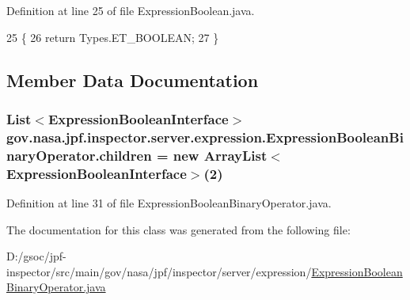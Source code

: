 Definition at line 25 of file Expression\+Boolean.\+java.


\begin{DoxyCode}
25                           \{
26     \textcolor{keywordflow}{return} Types.ET\_BOOLEAN;
27   \}
\end{DoxyCode}


\subsection{Member Data Documentation}
\subsubsection[{\texorpdfstring{children}{children}}]{\setlength{\rightskip}{0pt plus 5cm}List$<${\bf Expression\+Boolean\+Interface}$>$ gov.\+nasa.\+jpf.\+inspector.\+server.\+expression.\+Expression\+Boolean\+Binary\+Operator.\+children = new Array\+List$<${\bf Expression\+Boolean\+Interface}$>$(2)\hspace{0.3cm}{\ttfamily [protected]}}\hypertarget{classgov_1_1nasa_1_1jpf_1_1inspector_1_1server_1_1expression_1_1_expression_boolean_binary_operator_aa51f2a94e4b46898cc588a25f3957f6f}{}\label{classgov_1_1nasa_1_1jpf_1_1inspector_1_1server_1_1expression_1_1_expression_boolean_binary_operator_aa51f2a94e4b46898cc588a25f3957f6f}


Definition at line 31 of file Expression\+Boolean\+Binary\+Operator.\+java.



The documentation for this class was generated from the following file\+:\begin{DoxyCompactItemize}
\item 
D\+:/gsoc/jpf-\/inspector/src/main/gov/nasa/jpf/inspector/server/expression/\hyperlink{_expression_boolean_binary_operator_8java}{Expression\+Boolean\+Binary\+Operator.\+java}\end{DoxyCompactItemize}
